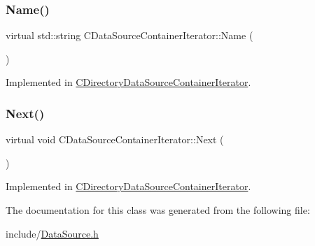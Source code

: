\hypertarget{classCDataSourceContainerIterator_a95b57204a76fab1d5a75a01189d5fcc5}{}\label{classCDataSourceContainerIterator_a95b57204a76fab1d5a75a01189d5fcc5} 
\subsubsection{\texorpdfstring{Name()}{Name()}}
{\footnotesize\ttfamily virtual std\+::string C\+Data\+Source\+Container\+Iterator\+::\+Name (\begin{DoxyParamCaption}{ }\end{DoxyParamCaption})\hspace{0.3cm}{\ttfamily [pure virtual]}}



Implemented in \hyperlink{classCDirectoryDataSourceContainerIterator_a24631e9ef36d3cb075e42d38912049ec}{C\+Directory\+Data\+Source\+Container\+Iterator}.

\hypertarget{classCDataSourceContainerIterator_a2a9cc99d17cd217727ac4ab5e78f1a35}{}\label{classCDataSourceContainerIterator_a2a9cc99d17cd217727ac4ab5e78f1a35} 
\subsubsection{\texorpdfstring{Next()}{Next()}}
{\footnotesize\ttfamily virtual void C\+Data\+Source\+Container\+Iterator\+::\+Next (\begin{DoxyParamCaption}{ }\end{DoxyParamCaption})\hspace{0.3cm}{\ttfamily [pure virtual]}}



Implemented in \hyperlink{classCDirectoryDataSourceContainerIterator_a2b58c5a78c5820e39cd2d9a61724a55e}{C\+Directory\+Data\+Source\+Container\+Iterator}.



The documentation for this class was generated from the following file\+:\begin{DoxyCompactItemize}
\item 
include/\hyperlink{DataSource_8h}{Data\+Source.\+h}\end{DoxyCompactItemize}
